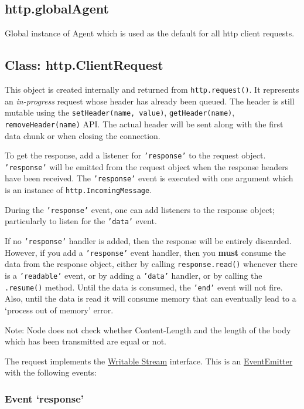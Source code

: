 \subsection{http.globalAgent}

Global instance of Agent which is used as the default for all http
client requests.

\subsection{Class: http.ClientRequest}

This object is created internally and returned from
\texttt{http.request()}. It represents an \emph{in-progress} request
whose header has already been queued. The header is still mutable using
the \texttt{setHeader(name, value)}, \texttt{getHeader(name)},
\texttt{removeHeader(name)} API. The actual header will be sent along
with the first data chunk or when closing the connection.

To get the response, add a listener for \texttt{'response'} to the
request object. \texttt{'response'} will be emitted from the request
object when the response headers have been received. The
\texttt{'response'} event is executed with one argument which is an
instance of \texttt{http.IncomingMessage}.

During the \texttt{'response'} event, one can add listeners to the
response object; particularly to listen for the \texttt{'data'} event.

If no \texttt{'response'} handler is added, then the response will be
entirely discarded. However, if you add a \texttt{'response'} event
handler, then you \textbf{must} consume the data from the response
object, either by calling \texttt{response.read()} whenever there is a
\texttt{'readable'} event, or by adding a \texttt{'data'} handler, or by
calling the \texttt{.resume()} method. Until the data is consumed, the
\texttt{'end'} event will not fire. Also, until the data is read it will
consume memory that can eventually lead to a `process out of memory'
error.

Note: Node does not check whether Content-Length and the length of the
body which has been transmitted are equal or not.

The request implements the
\href{stream.html\#stream\_writable\_stream}{Writable Stream} interface.
This is an
\href{events.html\#events\_class\_events\_eventemitter}{EventEmitter}
with the following events:

\subsubsection{Event `response'}

